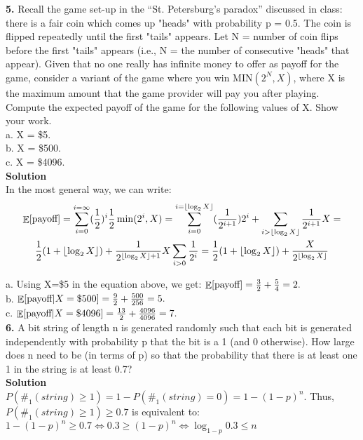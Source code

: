 \documentclass[10pt,a4paper,oneside,draft]{report}
\DeclareMathOperator{\EX}{\mathbb{E}}%
\DeclarePairedDelimiter\floor{\lfloor}{\rfloor}
\begin{document}
	
\textbf{5.} Recall the game set-up in the “St. Petersburg’s paradox” discussed in class: there is a fair coin which comes up "heads" with probability p = 0.5. The coin is flipped repeatedly until the first "tails" appears. Let N = number of coin flips before the first "tails" appears (i.e., N = the number of consecutive "heads" that appear). Given that no one really has infinite money to offer as payoff for the game, consider a variant of the game where you win MIN$(2^N , X)$,
where X is the maximum amount that the game provider will pay you after playing. Compute the expected payoff of the game for the following values of X. Show your work.\\
a. X = \$5. \\
b. X = \$500. \\
c. X = \$4096. \\

\textbf{Solution} \\

In the most general way, we can write: \\



\begin{gather*}
\EX[\textnormal{payoff}] = \sum_{i=0}^{i=\infty} (\frac{1}{2})^i \frac{1}{2} \min(2^i, X) = \sum_{i=0}^{i=\floor*{\log_2 X}} (\frac{1}{2^{i + 1}}) 2^i + \sum_{i>\floor*{\log_2 X}} \frac{1}{2^{i + 1}} X = \\
\frac{1}{2} (1 + \floor*{\log_2 X}) + \frac{1}{2^{ \floor*{\log_2 X} + 1 }} X \sum_{i>0} \frac{1}{2 ^ i} = \frac{1}{2} (1 + \floor*{\log_2 X}) + \frac{X}{2^{ \floor*{\log_2 X} }}
\end{gather*}

a. Using X=\$5 in the equation above, we get: $\EX[\textnormal{payoff}] = \frac{3}{2} + \frac{5}{4} = 2.$ \\

b. $\EX[\textnormal{payoff} | X=\$500] = \frac{9}{2} + \frac{500}{256} = 5.$ \\

c. $\EX[\textnormal{payoff} | X=\$4096] = \frac{13}{2} + \frac{4096}{4096} = 7.$\\

\textbf{6.} A bit string of length n is generated randomly such that each bit is generated independently
with probability p that the bit is a 1 (and 0 otherwise). How large does n need to be (in terms
of p) so that the probability that there is at least one 1 in the string is at least 0.7? \\

\textbf{Solution} \\

$P(\#_1(string) \geq 1) = 1 - P(\#_1(string)=0) = 1 - (1 - p)^n$.
Thus, $P(\#_1(string) \geq 1) \geq 0.7$ is equivalent to:
$1 - (1 - p)^n \geq 0.7 \iff 0.3 \geq (1 - p)^n \iff \log_{1-p} 0.3 \leq n $ 
\end{document}
